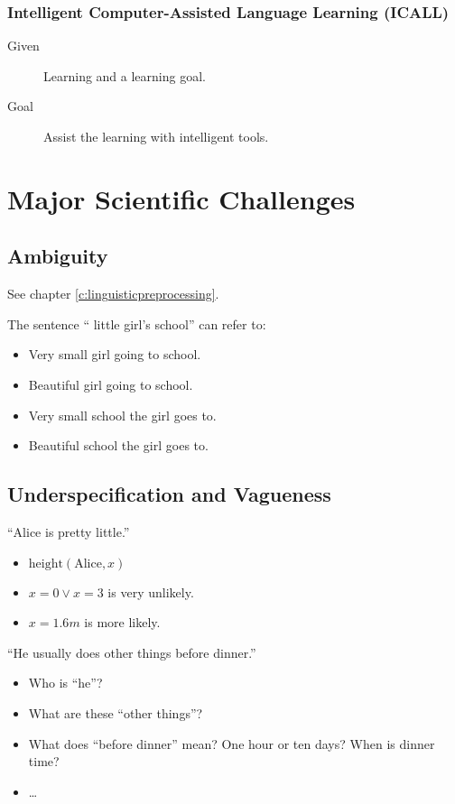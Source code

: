 			\subsubsection{Intelligent Computer-Assisted Language Learning (ICALL)} %
				\begin{description}
					\item[Given] Learning and a learning goal.
					\item[Goal] Assist the learning with intelligent tools.
				\end{description}

	\section{Major Scientific Challenges} %
		\subsection{Ambiguity} %
			See chapter \ref{c:linguisticpreprocessing}.

			The sentence \enquote{ little girl's school} can refer to:
			\begin{itemize}
				\item Very small girl going to school.
				\item Beautiful girl going to school.
				\item Very small school the girl goes to.
				\item Beautiful school the girl goes to.
			\end{itemize}

		\subsection{Underspecification and Vagueness} %
			\enquote{Alice is pretty little.}
			\begin{itemize}
				\item \( \text{height}(\text{Alice}, x) \)
				\item \( x = 0 \lor x = 3 \) is very unlikely.
				\item \( x = 1.6m \) is more likely.
			\end{itemize}

			\enquote{He usually does other things before dinner.}
			\begin{itemize}
				\item Who is \enquote{he}?
				\item What are these \enquote{other things}?
				\item What does \enquote{before dinner} mean? One hour or ten days? When is dinner time?
				\item \dots
			\end{itemize}

